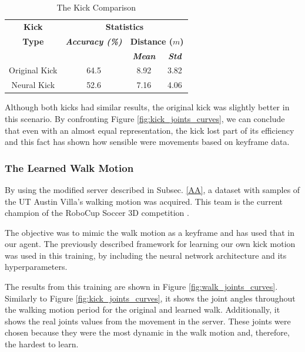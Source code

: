 \begin{table}[htbp]
	\caption{The Kick Comparison}
	\begin{center} 
		\begin{tabular}{|c|c|c|c|}
			\hline
			\textbf{Kick}&\multicolumn{3}{|c|}{\textbf{Statistics}} \\
			\cline{2-4} 
			\textbf{Type} & \textbf{\textit{Accuracy (\%)}}& \multicolumn{2}{|c|}{\textbf{Distance (\(m\))}} \\ 
			\cline {3-4}
			& & \textbf{\textit{Mean}}& \textbf{\textit{Std}} \\
			\hline
			Original Kick & 64.5 & 8.92 & 3.82  \\
			\hline
			Neural Kick & 52.6 & 7.16 & 4.06 \\
			\hline
		\end{tabular}
		\label{tab_kicks_statistics}
	\end{center}
\end{table}

Although both kicks had similar results, the original kick was slightly better in this scenario. By confronting Figure \ref{fig:kick_joints_curves}, we can conclude that even with an almost equal representation, the kick lost part of its efficiency and this fact has shown how sensible were movements based on keyframe data.

\subsubsection{The Learned Walk Motion}
By using the modified server described in Subsec. \ref{AA}, a dataset with samples of the UT Austin Villa's walking motion \cite{macalpine2013} was acquired. This team is the current champion of the RoboCup Soccer 3D competition \cite{macalpine2017}.

The objective was to mimic the walk motion as a keyframe and has used that in our agent. The previously described framework for learning our own kick motion was used in this training, by including the neural network architecture and its hyperparameters.

The results from this training are shown in Figure \ref{fig:walk_joints_curves}. Similarly to Figure \ref{fig:kick_joints_curves}, it shows the joint angles throughout the walking motion period for the original and learned walk. Additionally, it shows the real joints values from the movement in the server. These joints were chosen because they were the most dynamic in the walk motion and, therefore, the hardest to learn.

